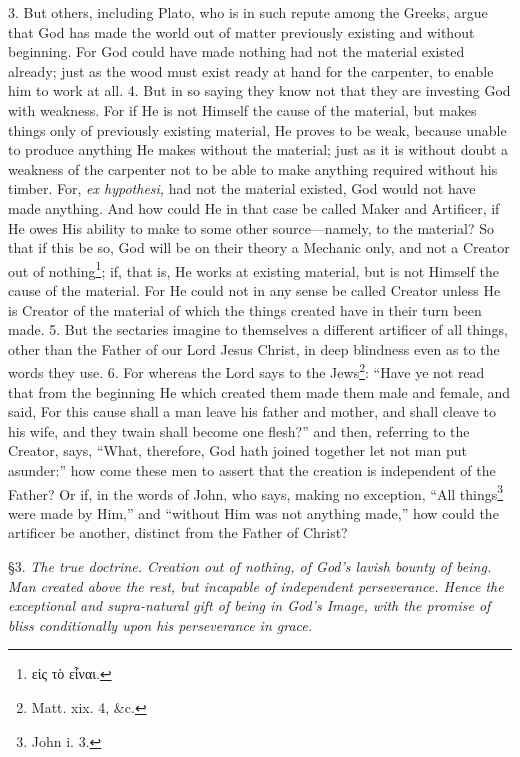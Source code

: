 3. But others, including Plato, who is in such repute among the Greeks, argue that God has made the world out of matter previously existing and without beginning. For God could have made nothing had not the material existed already; just as the wood must exist ready at hand for the carpenter, to enable him to work at all. 4. But in so saying they know not that they are investing God with weakness. For if He is not Himself the cause of the material, but makes things only of previously existing material, He proves to be weak, because unable to produce anything He makes without the material; just as it is without doubt a weakness of the carpenter not to be able to make anything required without his timber. For, \emph{ex hypothesi,} had not the material existed, God would not have made anything. And how could He in that case be called Maker and Artificer, if He owes His ability to make to some other source—namely, to the material? So that if this be so, God will be on their theory a Mechanic only, and not a Creator out of nothing\footnote{\textgreek{εἰς τὸ εἶναι}.}; if, that is, He works at existing material, but is not Himself the cause of the material. For He could not in any sense be called Creator unless He is Creator of the material of which the things created have in their turn been made. 5. But the sectaries imagine to themselves a different artificer of all things, other than the Father of our Lord Jesus Christ, in deep blindness even as to the words they use. 6. For whereas the Lord says to the Jews\footnote{Matt. xix. 4, \&c.}: “Have ye not read that from the beginning He which created them made them male and female, and said, For this cause shall a man leave his father and mother, and shall cleave to his wife, and they twain shall become one flesh?” and then, referring to the Creator, says, “What, therefore, God hath joined together let not man put asunder:” how come these men to assert that the creation is independent of the Father? Or if, in the words of John, who says, making no exception, “All things\footnote{John i. 3.} were made by Him,” and “without Him was not anything made,” how could the artificer be another, distinct from the Father of Christ?


§3. \emph{The true doctrine. Creation out of nothing, of God’s lavish bounty of being. Man created above the rest, but incapable of independent perseverance. Hence the exceptional and supra-natural gift of being in God’s Image, with the promise of bliss conditionally upon his perseverance in grace.}

